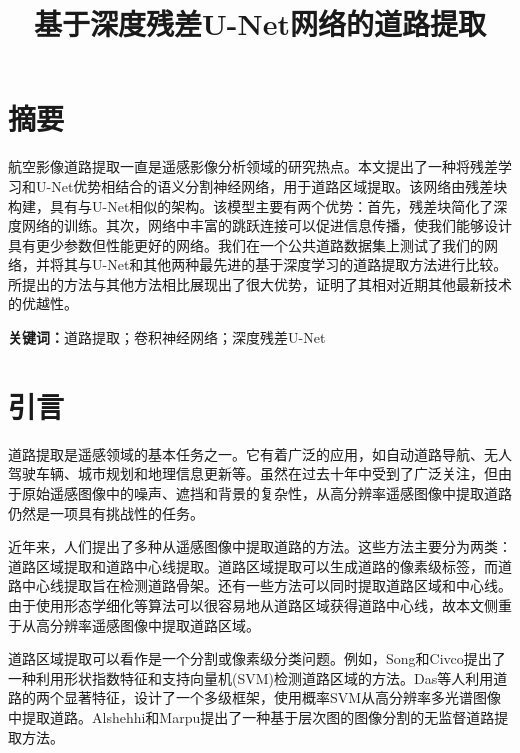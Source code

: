 
\begin{translation}
\label{cha:translation}

\title{基于深度残差U-Net网络的道路提取}
\maketitle

\tableofcontents

\section{摘要}

航空影像道路提取⼀直是遥感影像分析领域的研究热点。本文提出了一种将残差学习和U-Net优势相结合的语义分割神经网络，用于道路区域提取。该网络由残差块构建，具有与U-Net相似的架构。该模型主要有两个优势：首先，残差块简化了深度网络的训练。其次，网络中丰富的跳跃连接可以促进信息传播，使我们能够设计具有更少参数但性能更好的网络。我们在一个公共道路数据集上测试了我们的网络，并将其与U-Net和其他两种最先进的基于深度学习的道路提取方法进行比较。所提出的方法与其他方法相比展现出了很大优势，证明了其相对近期其他最新技术的优越性。

\textbf{关键词：}道路提取；卷积神经网络；深度残差U-Net

\section{引言}

道路提取是遥感领域的基本任务之一。它有着广泛的应用，如自动道路导航、无人驾驶车辆、城市规划和地理信息更新等。虽然在过去十年中受到了广泛关注，但由于原始遥感图像中的噪声、遮挡和背景的复杂性，从高分辨率遥感图像中提取道路仍然是一项具有挑战性的任务。

近年来，人们提出了多种从遥感图像中提取道路的方法。这些方法主要分为两类：道路区域提取和道路中心线提取。道路区域提取\cite{1,2,3,4,5,6}可以生成道路的像素级标签，而道路中心线提取\cite{7,8}旨在检测道路骨架。还有一些方法可以同时提取道路区域和中心线\cite{9}。由于使用形态学细化等算法可以很容易地从道路区域获得道路中心线\cite{10}，故本文侧重于从高分辨率遥感图像中提取道路区域。

道路区域提取可以看作是一个分割或像素级分类问题。例如，Song和Civco\cite{11}提出了一种利用形状指数特征和支持向量机(SVM)检测道路区域的方法。Das等人\cite{12}利用道路的两个显著特征，设计了一个多级框架，使用概率SVM从高分辨率多光谱图像中提取道路。Alshehhi和Marpu\cite{6}提出了一种基于层次图的图像分割的无监督道路提取方法。


\end{translation}
